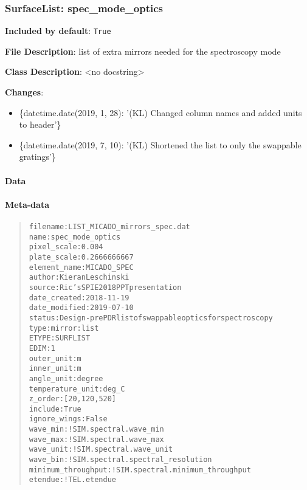 \subsubsection{SurfaceList: \textquotedbl{}spec\_mode\_optics\textquotedbl{}%
  \label{surfacelist-spec-mode-optics}%
}

\textbf{Included by default}: \texttt{True}

\textbf{File Description}: list of extra mirrors needed for the spectroscopy mode

\textbf{Class Description}: <no docstring>

\textbf{Changes}:

\begin{itemize}
\item \{datetime.date(2019, 1, 28): '(KL) Changed column names and added units to header'\}

\item \{datetime.date(2019, 7, 10): '(KL) Shortened the list to only the swappable gratings'\}
\end{itemize}


\paragraph{Data%
  \label{data}%
}


\paragraph{Meta-data%
  \label{meta-data}%
}

\begin{quote}
\begin{alltt}
          filename : LIST_MICADO_mirrors_spec.dat
              name : spec_mode_optics
       pixel_scale : 0.004
       plate_scale : 0.2666666667
      element_name : MICADO_SPEC
            author : Kieran Leschinski
            source : Ric's SPIE 2018 PPT presentation
      date_created : 2018-11-19
     date_modified : 2019-07-10
            status : Design - pre PDR list of swappable optics for spectroscopy
              type : mirror:list
             ETYPE : SURFLIST
              EDIM : 1
        outer_unit : m
        inner_unit : m
        angle_unit : degree
  temperature_unit : deg_C
           z_order : [20, 120, 520]
           include : True
      ignore_wings : False
          wave_min : !SIM.spectral.wave_min
          wave_max : !SIM.spectral.wave_max
         wave_unit : !SIM.spectral.wave_unit
          wave_bin : !SIM.spectral.spectral_resolution
minimum_throughput : !SIM.spectral.minimum_throughput
           etendue : !TEL.etendue
\end{alltt}
\end{quote}


